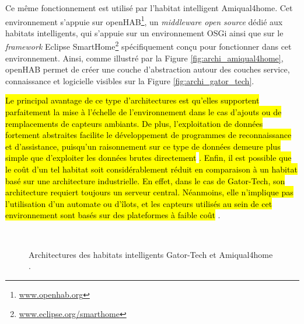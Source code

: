 Ce même fonctionnement est utilisé par l'habitat intelligent Amiqual4home. Cet environnement s'appuie sur \ac{openHAB}\footnote{\url{www.openhab.org}}, un \textit{middleware open source} dédié aux habitats intelligents, qui s'appuie sur un environnement \acs{OSGi} ainsi que sur le \textit{framework} Eclipse SmartHome\footnote{\url{www.eclipse.org/smarthome}} spécifiquement conçu pour fonctionner dans cet environnement. Ainsi, comme illustré par la Figure \ref{fig:archi_amiqual4home}, \acs{openHAB} permet de créer une couche d'abstraction autour des couches service, connaissance et logicielle visibles sur la Figure \ref{fig:archi_gator_tech}.

\hl{Le principal avantage de ce type d'architectures est qu'elles supportent parfaitement la mise à l'échelle de l'environnement dans le cas d'ajouts ou de remplacements de capteurs ambiants. De plus, l'exploitation de données fortement abstraites facilite le développement de programmes de reconnaissance et d'assistance, puisqu'un raisonnement sur ce type de données demeure plus simple que d'exploiter les données brutes directement} \citep{Helal2005}\hl{. Enfin, il est possible que le coût d'un tel habitat soit considérablement réduit en comparaison à un habitat basé sur une architecture industrielle. En effet, dans le cas de Gator-Tech, son architecture requiert toujours un serveur central. Néanmoins, elle n'implique pas l'utilisation d'un automate ou d'îlots, et les capteurs utilisés au sein de cet environnement sont basés sur des plateformes à faible coût} \citep{Helal2005}.

\begin{figure}[H]
	\centering
	\\[20pt]
	\caption[Architectures des habitats intelligents Gator-Tech et Amiqual4home.]{Architectures des habitats intelligents Gator-Tech \citep{Helal2005} et Amiqual4home \citep{Lago2017}.}
\end{figure}

